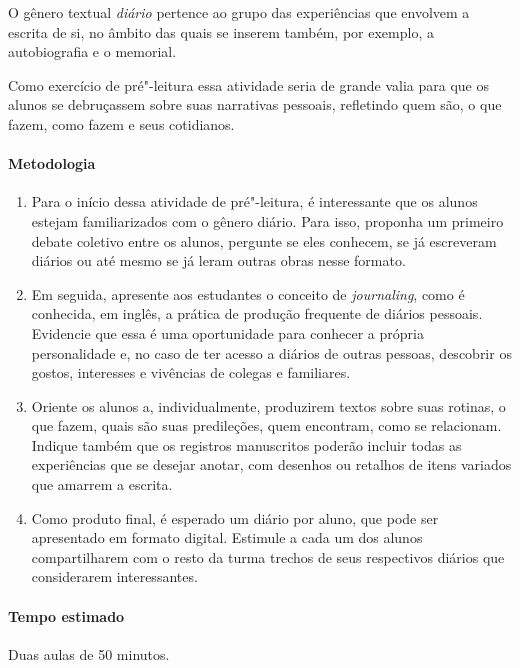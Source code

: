 \documentclass[12pt]{extarticle}
\begin{document}
O gênero textual \textit{diário} pertence ao grupo das experiências que envolvem
a escrita de si, no âmbito das quais se inserem também, por exemplo, a
autobiografia e o memorial.

Como exercício de pré"-leitura essa atividade seria de grande valia para 
que os alunos se debruçassem sobre suas narrativas pessoais, refletindo quem 
são, o que fazem, como fazem e seus cotidianos. 

\paragraph{Metodologia}

\begin{enumerate}

\item
Para o início dessa atividade de pré"-leitura, é interessante que os
alunos estejam familiarizados com o gênero diário. 
Para isso, proponha um primeiro debate
coletivo entre os alunos, pergunte se eles 
conhecem, se já escreveram diários ou até mesmo se 
já leram outras obras nesse formato.

\item
Em seguida, apresente aos estudantes o conceito de \emph{journaling},  
como é conhecida, em inglês, a prática de produção frequente de diários pessoais. Evidencie que essa é uma 
oportunidade para conhecer a própria personalidade e, no caso de ter acesso a diários de 
outras pessoas, descobrir os gostos, interesses e vivências de colegas e familiares. 

\item
Oriente os alunos a, individualmente, produzirem textos sobre suas rotinas, o que fazem, 
quais são suas predileções, quem encontram, como se relacionam. Indique também que os 
registros manuscritos poderão incluir todas as experiências que se desejar anotar, com 
desenhos ou retalhos de itens variados que amarrem a escrita. 

\item
Como produto final, é esperado um diário por aluno, que pode ser apresentado 
em formato digital. Estimule a cada um dos alunos compartilharem com o resto da turma 
trechos de seus respectivos diários que considerarem interessantes. 

\end{enumerate}

\paragraph{Tempo estimado} Duas aulas de 50 minutos. 
\end{document}
